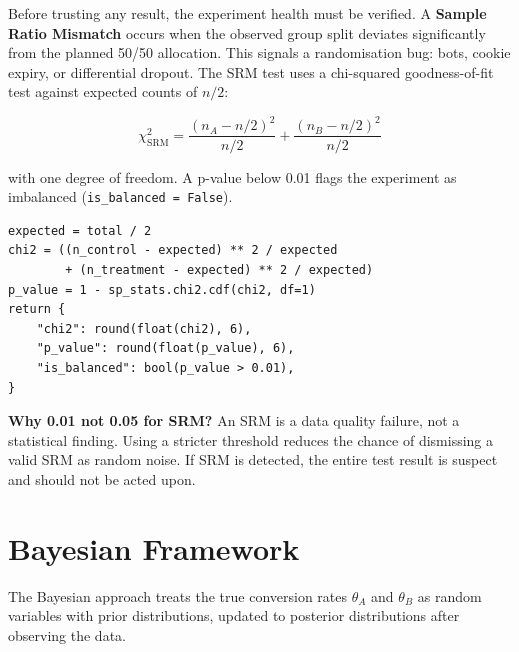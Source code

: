 Before trusting any result, the experiment health must be verified. A
\textbf{Sample Ratio Mismatch} occurs when the observed group split deviates
significantly from the planned 50/50 allocation. This signals a randomisation
bug: bots, cookie expiry, or differential dropout. The SRM test uses a
chi-squared goodness-of-fit test against expected counts of $n/2$:

\begin{equation}
  \chi^2_{\mathrm{SRM}} =
  \frac{(n_A - n/2)^2}{n/2} + \frac{(n_B - n/2)^2}{n/2}
  \label{eq:srm}
\end{equation}

with one degree of freedom. A p-value below 0.01 flags the experiment as
imbalanced (\texttt{is\_balanced = False}).

\begin{lstlisting}[style=python, caption={SRM test (stats\_engine.py lines 455--462)}]
expected = total / 2
chi2 = ((n_control - expected) ** 2 / expected
        + (n_treatment - expected) ** 2 / expected)
p_value = 1 - sp_stats.chi2.cdf(chi2, df=1)
return {
    "chi2": round(float(chi2), 6),
    "p_value": round(float(p_value), 6),
    "is_balanced": bool(p_value > 0.01),
}
\end{lstlisting}

\begin{decisionbox}
  \textbf{Why 0.01 not 0.05 for SRM?} An SRM is a data quality failure, not a
  statistical finding. Using a stricter threshold reduces the chance of
  dismissing a valid SRM as random noise. If SRM is detected, the entire
  test result is suspect and should not be acted upon.
\end{decisionbox}

\section{Bayesian Framework}
\label{sec:abtest-bayesian}


The Bayesian approach treats the true conversion rates $\theta_A$ and $\theta_B$
as random variables with prior distributions, updated to posterior distributions
after observing the data.

